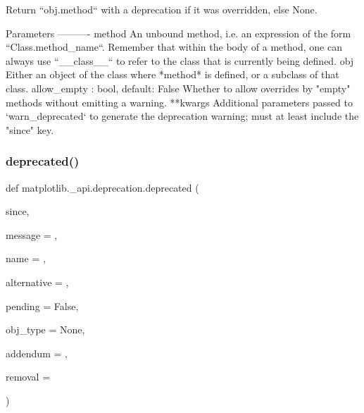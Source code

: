 \begin{DoxyVerb}Return ``obj.method`` with a deprecation if it was overridden, else None.

Parameters
----------
method
    An unbound method, i.e. an expression of the form
    ``Class.method_name``.  Remember that within the body of a method, one
    can always use ``__class__`` to refer to the class that is currently
    being defined.
obj
    Either an object of the class where *method* is defined, or a subclass
    of that class.
allow_empty : bool, default: False
    Whether to allow overrides by "empty" methods without emitting a
    warning.
**kwargs
    Additional parameters passed to `warn_deprecated` to generate the
    deprecation warning; must at least include the "since" key.
\end{DoxyVerb}
 \mbox{\label{namespacematplotlib_1_1__api_1_1deprecation_a1b5ff66854ee6a80dd3f3b65a63168eb}} 
\subsubsection{\texorpdfstring{deprecated()}{deprecated()}}
{\footnotesize\ttfamily def matplotlib.\+\_\+api.\+deprecation.\+deprecated (\begin{DoxyParamCaption}\item[{}]{since,  }\item[{}]{message = {\ttfamily \textquotesingle{}\textquotesingle{}},  }\item[{}]{name = {\ttfamily \textquotesingle{}\textquotesingle{}},  }\item[{}]{alternative = {\ttfamily \textquotesingle{}\textquotesingle{}},  }\item[{}]{pending = {\ttfamily False},  }\item[{}]{obj\+\_\+type = {\ttfamily None},  }\item[{}]{addendum = {\ttfamily \textquotesingle{}\textquotesingle{}},  }\item[{}]{removal = {\ttfamily \textquotesingle{}\textquotesingle{}} }\end{DoxyParamCaption})}

